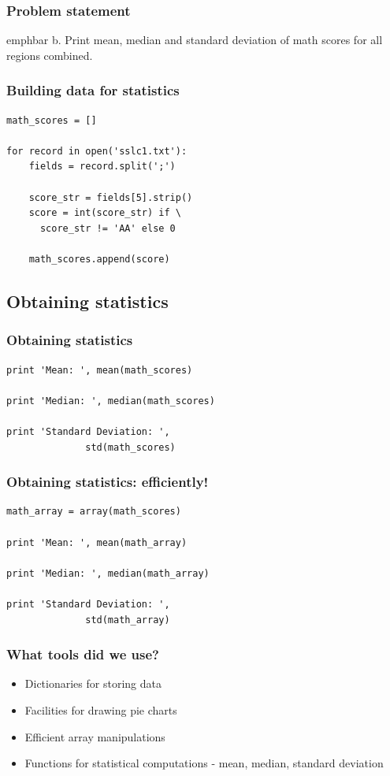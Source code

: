 \documentclass[14pt,compress]{beamer}
\newcommand{\emphbar}[1]
{\begin{beamercolorbox}[rounded=true]{emphbar} 
      {#1}
 \end{beamercolorbox}
}
\newcounter{time}
\newcommand{\inctime}[1]{\addtocounter{time}{#1}{\tiny \thetime\ m}}
\begin{document}
\begin{frame}
  \frametitle{Problem statement}
    \emphbar{b. Print mean, median and standard deviation of math scores for all regions combined.}
\end{frame}

\begin{frame}[fragile]
  \frametitle{Building data for statistics}
  \begin{lstlisting}
math_scores = []

for record in open('sslc1.txt'):
    fields = record.split(';')

    score_str = fields[5].strip()
    score = int(score_str) if \
      score_str != 'AA' else 0

    math_scores.append(score)
  \end{lstlisting}
\end{frame}

\subsection{Obtaining statistics}
\begin{frame}[fragile]
  \frametitle{Obtaining statistics}
  \begin{lstlisting}
print 'Mean: ', mean(math_scores)

print 'Median: ', median(math_scores)

print 'Standard Deviation: ',
              std(math_scores)
  \end{lstlisting}
  \inctime{10}
\end{frame}

\begin{frame}[fragile]
  \frametitle{Obtaining statistics: efficiently!}
  \begin{lstlisting}
math_array = array(math_scores)

print 'Mean: ', mean(math_array)

print 'Median: ', median(math_array)

print 'Standard Deviation: ',
              std(math_array)
  \end{lstlisting}
  \inctime{5}
\end{frame}

\begin{frame}[fragile]
  \frametitle{What tools did we use?}
  \begin{itemize}
   \item Dictionaries for storing data
   \item Facilities for drawing pie charts
   \item Efficient array manipulations
   \item Functions for statistical computations - mean, median, standard deviation
  \end{itemize}
\end{frame}
\end{document}
